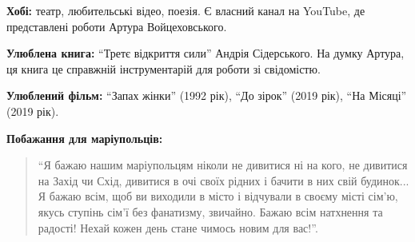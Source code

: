 \begingroup
\em

\textbf{Хобі:} театр, любительські відео, поезія. Є власний канал на YouTube, де
представлені роботи Артура Войцеховського.

\textbf{Улюблена книга:} \enquote{Третє відкриття сили} Андрія Сідерського. На думку Артура, ця
книга це справжній інструментарій для роботи зі свідомістю.

\textbf{Улюблений фільм:} \enquote{Запах жінки} (1992 рік), \enquote{До зірок} (2019 рік), \enquote{На Місяці}
(2019 рік).

\textbf{Побажання для маріупольців:} 

\begin{quote}
\enquote{Я бажаю нашим маріупольцям ніколи не дивитися ні на кого, не дивитися на Захід
чи Схід, дивитися в очі своїх рідних і бачити в них свій будинок... Я бажаю всім,
щоб ви виходили в місто і відчували в своєму місті сім'ю, якусь ступінь сім'ї
без фанатизму, звичайно. Бажаю всім натхнення та радості! Нехай кожен день
стане чимось новим для вас!}.
\end{quote}

\endgroup
